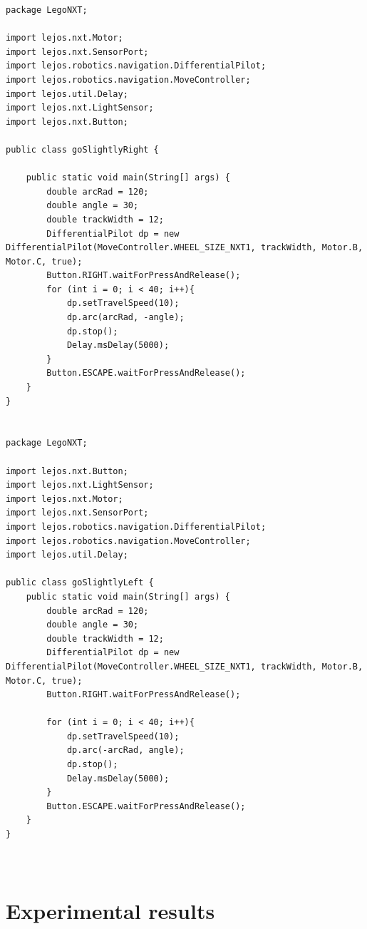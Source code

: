 \documentclass[a4paper, 12pt]{article}
\begin{document}
\begin{lstlisting}
package LegoNXT;

import lejos.nxt.Motor;
import lejos.nxt.SensorPort;
import lejos.robotics.navigation.DifferentialPilot;
import lejos.robotics.navigation.MoveController;
import lejos.util.Delay;
import lejos.nxt.LightSensor;
import lejos.nxt.Button;

public class goSlightlyRight {

	public static void main(String[] args) {
		double arcRad = 120;
		double angle = 30;
		double trackWidth = 12;
		DifferentialPilot dp = new DifferentialPilot(MoveController.WHEEL_SIZE_NXT1, trackWidth, Motor.B, Motor.C, true);
		Button.RIGHT.waitForPressAndRelease();
		for (int i = 0; i < 40; i++){
			dp.setTravelSpeed(10);
			dp.arc(arcRad, -angle);
			dp.stop();
			Delay.msDelay(5000);
		}
		Button.ESCAPE.waitForPressAndRelease();
	}
}


package LegoNXT;

import lejos.nxt.Button;
import lejos.nxt.LightSensor;
import lejos.nxt.Motor;
import lejos.nxt.SensorPort;
import lejos.robotics.navigation.DifferentialPilot;
import lejos.robotics.navigation.MoveController;
import lejos.util.Delay;

public class goSlightlyLeft {
	public static void main(String[] args) {
		double arcRad = 120;
		double angle = 30;
		double trackWidth = 12;
		DifferentialPilot dp = new DifferentialPilot(MoveController.WHEEL_SIZE_NXT1, trackWidth, Motor.B, Motor.C, true);
		Button.RIGHT.waitForPressAndRelease();
		
		for (int i = 0; i < 40; i++){
			dp.setTravelSpeed(10);
			dp.arc(-arcRad, angle);
			dp.stop();
			Delay.msDelay(5000);
		}
		Button.ESCAPE.waitForPressAndRelease();
	}
}



\end{lstlisting}
\newpage
\section{Experimental results}
\end{document}
